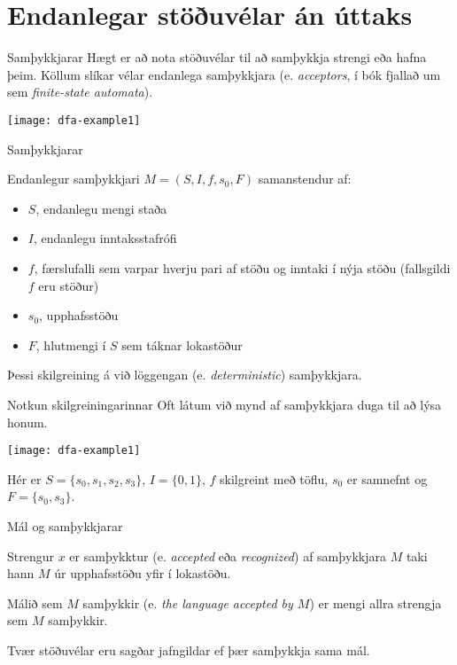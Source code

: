 \documentclass[handout]{beamer}
\begin{document}
\section{Endanlegar stöðuvélar án úttaks}

\begin{frame}{Samþykkjarar}
Hægt er að nota stöðuvélar til að samþykkja strengi eða hafna þeim. Köllum slíkar vélar endanlega samþykkjara (e. \emph{acceptors}, í bók fjallað um sem \emph{finite-state automata}).

\begin{center}
\texttt{[image: dfa-example1]}
\end{center}
\end{frame}

\begin{frame}{Samþykkjarar}
    \begin{tcolorbox}[title=Samþykkjarar]
        Endanlegur samþykkjari $M = (S, I , f, s_0, F)$ samanstendur af:
        \begin{itemize}
            \item $S$, endanlegu mengi staða
            \item $I$, endanlegu inntaksstafrófi
            \item $f$, færslufalli sem varpar hverju pari af stöðu og inntaki í nýja stöðu (fallsgildi $f$ eru stöður)
            \item $s_0$, upphafsstöðu
            \item $F$, hlutmengi í $S$ sem táknar lokastöður
        \end{itemize}
    \end{tcolorbox}
    Þessi skilgreining á við löggengan (e. \emph{deterministic}) samþykkjara.
\end{frame}

\begin{frame}{Notkun skilgreiningarinnar}
    Oft látum við mynd af samþykkjara duga til að lýsa honum.
    \begin{center}
        \texttt{[image: dfa-example1]}
    \end{center}
    Hér er $S=\{s_0, s_1,s_2,s_3\}$, $I = \{0,1\}$, $f$ skilgreint með töflu, $s_0$ er samnefnt og $F=\{s_0, s_3\}$.
\end{frame}

\begin{frame}{Mál og samþykkjarar}
\begin{tcolorbox}
Strengur $x$ er samþykktur (e. \emph{accepted} eða \emph{recognized}) af samþykkjara $M$ taki hann $M$ úr upphafsstöðu yfir í lokastöðu.

Málið sem $M$ samþykkir (e. \emph{the language accepted by $M$}) er mengi allra strengja sem $M$ samþykkir.
\end{tcolorbox}
Tvær stöðuvélar eru sagðar jafngildar ef þær samþykkja sama mál.
\end{frame}
\end{document}
